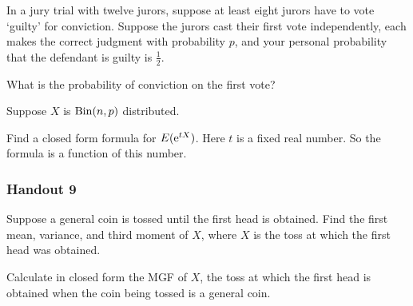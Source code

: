 \begin{problem}[Handout 8, \# 6]
  In a jury trial with twelve jurors, suppose at least eight jurors have to
  vote `guilty' for conviction. Suppose the jurors cast their first vote
  independently, each makes the correct judgment with probability \(p\),
  and your personal probability that the defendant is guilty is
  \(\frac{1}{2}\).

  \noindent What is the probability of conviction on the first vote?
\end{problem}
\begin{solution*}
\end{solution*}

\begin{problem}[Handout 8, \# 11]
  Suppose \(X\) is \(\operatorname{Bin}(n,p)\) distributed.

  \noindent Find a closed form formula for \(E(\mathrm{e}^{tX})\). Here \(t\) is
  a fixed real number. So the formula is a function of this number.
\end{problem}
\begin{solution*}
\end{solution*}

\subsubsection{Handout 9}
\begin{problem}[Handout 9, \# 6]
  Suppose a general coin is tossed until the first head is obtained. Find
  the first mean, variance, and third moment of \(X\), where \(X\) is the
  toss at which the first head was obtained.
\end{problem}
\begin{solution*}
\end{solution*}

\begin{problem}[Handout 9, \# 8]
  Calculate in closed form the MGF of \(X\), the toss at which the first
  head is obtained when the coin being tossed is a general coin.
\end{problem}
\begin{solution*}
\end{solution*}

